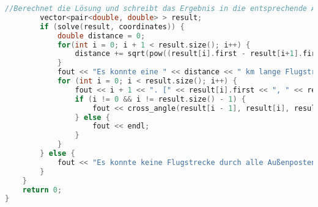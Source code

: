 \documentclass[a4paper,10pt,ngerman]{scrartcl}
\begin{document}
\begin{lstlisting}[frame=single,language=C++,title=Methode main,breaklines=true,label={lst:code_main}]
        //Berechnet die Lösung und schreibt das Ergebnis in die entsprechende Ausgabedatei
        vector<pair<double, double> > result;
        if (solve(result, coordinates)) {
            double distance = 0;
            for(int i = 0; i + 1 < result.size(); i++) {
                distance += sqrt(pow((result[i].first - result[i+1].first), 2.0) + (pow((result[i].second - result[i+1].second), 2.0)));
            }
            fout << "Es konnte eine " << distance << " km lange Flugstrecke durch alle Außenposten ermittelt werden." << endl;
            for (int i = 0; i < result.size(); i++) {
                fout << i + 1 << ". [" << result[i].first << ", " << result[i].second << "] ";
                if (i != 0 && i != result.size() - 1) {
                    fout << cross_angle(result[i - 1], result[i], result[i + 1]) << "° " << endl;
                } else {
                    fout << endl;
                }
            }
        } else {
            fout << "Es konnte keine Flugstrecke durch alle Außenposten ermittelt werden." << endl;
        }
    }
    return 0;
}
    \end{lstlisting}
\end{document}

